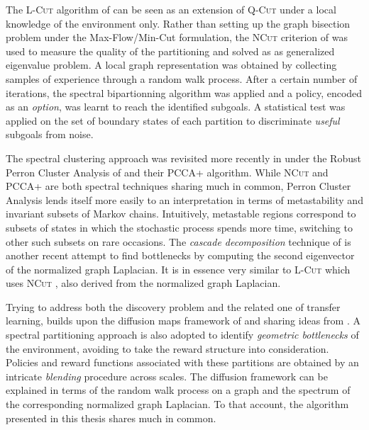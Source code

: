 The \textsc{L-Cut} algorithm of \cite{Simsek2005} can be seen as an extension of \textsc{Q-Cut} under a local knowledge of the environment only. Rather than setting up the graph bisection problem under the Max-Flow/Min-Cut formulation, the \textsc{NCut} criterion of \cite{ShiMalik2000} was used to measure the quality of the partitioning and solved as as generalized eigenvalue problem. A local graph representation was obtained by collecting samples of experience through a random walk process. After a certain number of iterations, the spectral bipartionning algorithm was applied and a policy, encoded as an \textit{option}, was learnt to reach the identified subgoals. A statistical test was applied on the set of boundary states of each partition to discriminate \textit{useful} subgoals from noise.

The spectral clustering approach was revisited more recently in \cite{Mathew2012} under the Robust Perron Cluster Analysis of \cite{Weber2004} and their  \textsc{PCCA+} algorithm. While \textsc{NCut} and \textsc{PCCA+} are both spectral techniques sharing much in common,  Perron Cluster Analysis lends itself more easily to an interpretation in terms of metastability and invariant subsets of Markov chains. Intuitively, metastable regions correspond to subsets of states in which the stochastic process spends more time, switching to other such subsets on rare occasions. The \textit{cascade decomposition} technique of \cite{Chiu2010} is another recent attempt to find bottlenecks by computing the second eigenvector of the normalized graph Laplacian. It is in essence very similar to \textsc{L-Cut} which uses \textsc{NCut} \cite{ShiMalik2000}, also derived from the normalized graph Laplacian. 

Trying to address both the discovery problem and the related one of transfer learning, \cite{Bouvrie2012} builds upon the diffusion maps framework of \cite{Coifman2006} and sharing ideas from \cite{Mahadevan2007}. A spectral partitioning approach is also adopted to identify \textit{geometric bottlenecks} of the environment, avoiding to take the reward structure into consideration. Policies and reward functions associated with these partitions are obtained by an intricate \textit{blending} procedure across scales. The diffusion framework can be explained in terms of the random walk process on a graph and the spectrum of the corresponding normalized graph Laplacian. To that account, the algorithm presented in this thesis shares much in common. 


